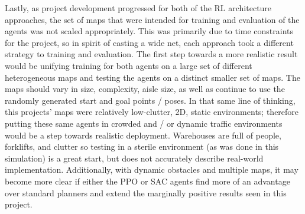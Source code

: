 \documentclass[conference]{IEEEtran}
\begin{document}
    Lastly, as project development progressed for both of the RL architecture approaches, the set of maps that were intended for training and evaluation of the agents was not scaled appropriately. This was primarily due to time constraints for the project, so in spirit of casting a wide net, each approach took a different strategy to training and evaluation.
    The first step towards a more realistic result would be unifying training for both agents on a large set of different heterogeneous maps and testing the agents on a distinct smaller set of maps. The maps should vary in size, complexity, aisle size, as well as continue to use the randomly generated start and goal points / poses. In that same line of thinking, this projects' maps were relatively low-clutter, 2D, static environments; therefore putting these same agents in crowded and / or dynamic traffic environments would be a step towards realistic deployment. Warehouses are full of people, forklifts, and clutter so testing in a sterile environment (as was done in this simulation) is a great start, but does not accurately describe real-world implementation. Additionally, with dynamic obstacles and multiple maps, it may become more clear if either the PPO or SAC agents find more of an advantage over standard planners and extend the marginally positive results seen in this project.
\end{document}
